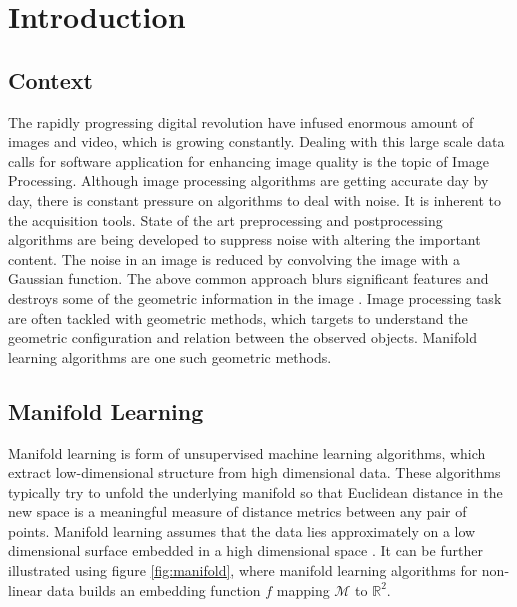 \chapter{Introduction} %

\label{Chapter1} %


\section{Context}
\label{context}
The rapidly progressing digital revolution have infused enormous amount of images and video, which is growing constantly. Dealing with this large scale data calls for software application for enhancing image quality is the topic of Image Processing. Although image processing algorithms are getting accurate day by day, there is constant pressure on algorithms to deal with noise. It is inherent to the acquisition tools. State of the art preprocessing and postprocessing algorithms are being developed to suppress noise with altering the important content. The noise in an image is reduced by convolving the image with a Gaussian function. The above common approach blurs significant features and destroys some of the geometric information in the image \citep{Thor2009}. Image processing task are often tackled with geometric methods, which targets to understand the geometric configuration and relation between the observed objects. Manifold learning algorithms are one such geometric methods.

\section{Manifold Learning}
Manifold learning is form of unsupervised machine learning algorithms, which  extract low-dimensional structure from high dimensional data. These algorithms typically try to unfold the underlying manifold so that Euclidean distance in the new space is a meaningful measure of distance metrics between any pair of points. Manifold learning assumes that the data lies approximately on a low dimensional surface embedded in a high dimensional space \citep{Tal2008}. It can be further illustrated  using figure \ref{fig:manifold}, where manifold learning algorithms for non-linear data builds an embedding function $f$ mapping $\mathcal{M}$ to $\mathbb{R}^2$.

